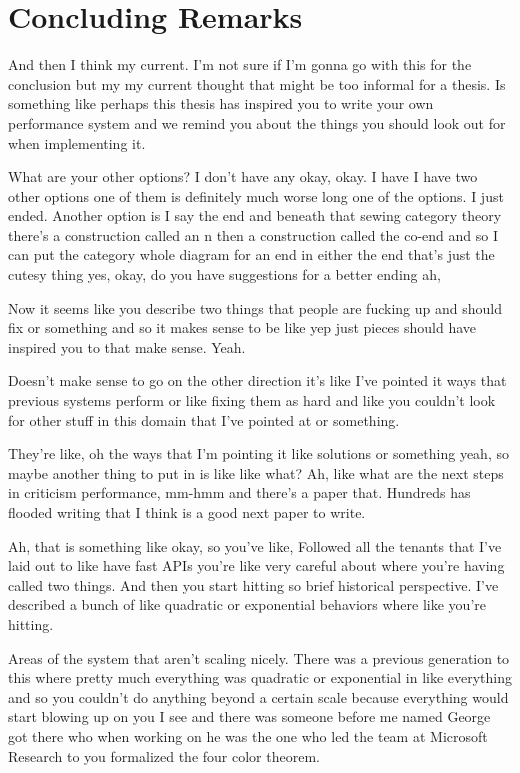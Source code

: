 \chapter{Concluding Remarks}
And then I think my current. I'm not sure if I'm gonna go with this for the conclusion but my my current thought that might be too informal for a thesis. Is something like perhaps this thesis has inspired you to write your own performance system and we remind you about the things you should look out for when implementing it. 

What are your other options? I don't have any okay, okay. I have I have two other options one of them is definitely much worse long one of the options. I just ended. Another option is I say the end and beneath that sewing category theory there's a construction called an n then a construction called the co-end and so I can put the category whole diagram for an end in either the end that's just the cutesy thing yes, okay, do you have suggestions for a better ending ah, 

Now it seems like you describe two things that people are fucking up and should fix or something and so it makes sense to be like yep just pieces should have inspired you to that make sense. Yeah. 

Doesn't make sense to go on the other direction it's like I've pointed it ways that previous systems perform or like fixing them as hard and like you couldn't look for other stuff in this domain that I've pointed at or something. 

They're like, oh the ways that I'm pointing it like solutions or something yeah, so maybe another thing to put in is like like what? Ah, like what are the next steps in criticism performance, mm-hmm and there's a paper that. Hundreds has flooded writing that I think is a good next paper to write. 

Ah, that is something like okay, so you've like, Followed all the tenants that I've laid out to like have fast APIs you're like very careful about where you're having called two things. And then you start hitting so brief historical perspective. I've described a bunch of like quadratic or exponential behaviors where like you're hitting. 

Areas of the system that aren't scaling nicely. There was a previous generation to this where pretty much everything was quadratic or exponential in like everything and so you couldn't do anything beyond a certain scale because everything would start blowing up on you I see and there was someone before me named George got there who when working on he was the one who led the team at Microsoft Research to you formalized the four color theorem. 

